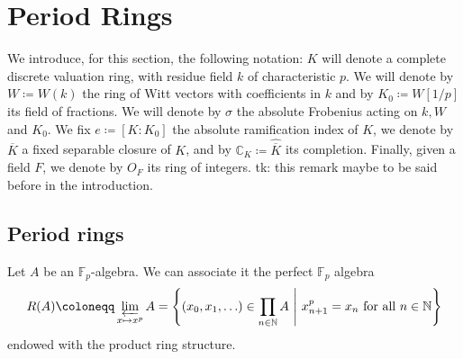 \section{Period Rings}
%
We introduce, for this section, the following notation:
$K$ will denote a complete discrete valuation ring, with residue field $k$
of characteristic $p$.
We will denote by $W \coloneqq W(k)$ the ring of Witt vectors with coefficients in $k$
and by $K_0 \coloneqq W[1/p]$ its field of fractions.
We will denote by $\sigma$ the absolute Frobenius acting
on $k, W$ and $K_0$.
We fix $e \coloneqq [ K : K_0 ]$ the absolute ramification index of $K$,
we denote by $\overline{K}$ a fixed separable closure of $K$,
and by $\mathbb{C}_K \coloneqq \widehat{\overline{K}}$ its completion.
Finally, given a field $F$, we denote by $O_F$ its ring of integers.
tk: this remark maybe to be said before in the introduction.



\subsection{Period rings}
\begin{defn}[]
	Let $A$ be an $\mathbb{F}_p$-algebra.
	We can associate it the perfect $\mathbb{F}_p$ algebra
	\begin{equation*}
		R(A) \coloneqq \varprojlim_{x \mapsto x^p} A =
		\left\{ \left( x_0, x_1, \ldots \right) \in \prod_{n \in \mathbb{N}} A
		\ \middle|\ x_{n+1}^p = x_n \text{ for all } n \in \mathbb{N} \right\}
	\end{equation*}
	endowed with the product ring structure.
\end{defn}


